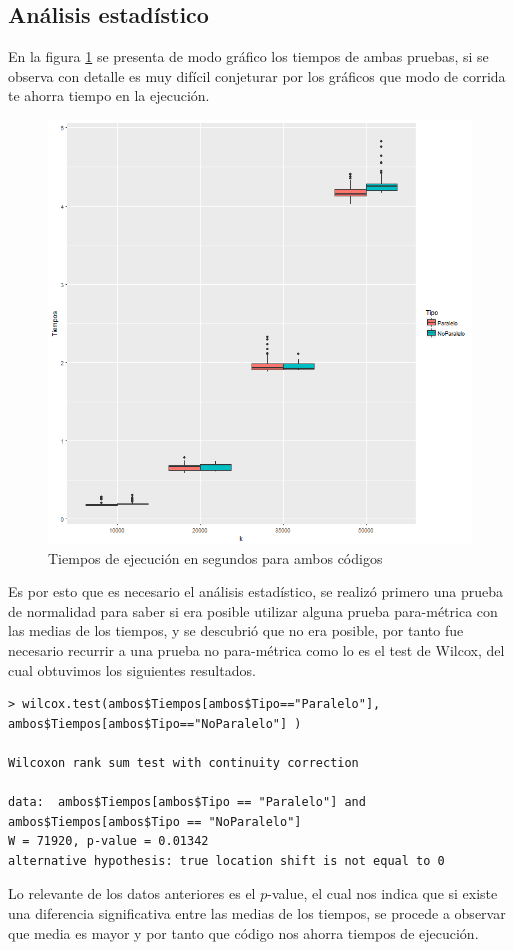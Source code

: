 \documentclass[a4paper]{article}
\begin{document}
\subsection{Análisis estadístico}
En la figura \ref{fig:ambos} se presenta de modo gráfico los tiempos de ambas pruebas, si se observa con detalle es muy difícil conjeturar por los gráficos que modo de corrida te ahorra tiempo en la ejecución.

\begin{figure}[h]
	\centering
	\includegraphics[width=0.7\linewidth]{ambos}
	\caption{Tiempos de ejecución en segundos para ambos códigos}
	\label{fig:ambos}
\end{figure}

Es por esto que es necesario el análisis estadístico, se realizó primero una prueba de normalidad para saber si era posible utilizar alguna prueba para-métrica con las medias de los tiempos, y se descubrió que no era posible, por tanto fue necesario recurrir a una prueba no para-métrica como lo es el test de Wilcox, del cual obtuvimos los siguientes resultados.

\begin{lstlisting}[frame=single]
> wilcox.test(ambos$Tiempos[ambos$Tipo=="Paralelo"],
ambos$Tiempos[ambos$Tipo=="NoParalelo"] )

Wilcoxon rank sum test with continuity correction

data:  ambos$Tiempos[ambos$Tipo == "Paralelo"] and 
ambos$Tiempos[ambos$Tipo == "NoParalelo"]
W = 71920, p-value = 0.01342
alternative hypothesis: true location shift is not equal to 0
\end{lstlisting}

Lo relevante de los datos anteriores es el $p$-value, el cual nos indica que si existe una diferencia significativa entre las medias de los tiempos, se procede a observar que media es mayor y por tanto que código nos ahorra tiempos de ejecución.
\end{document}

